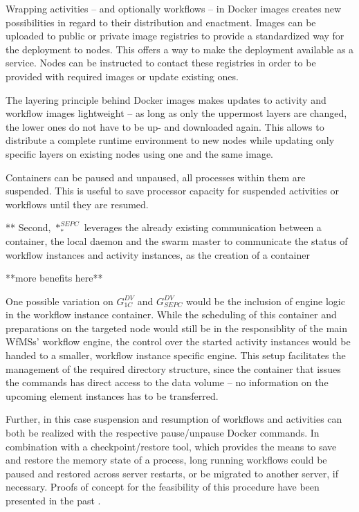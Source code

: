     Wrapping activities -- and optionally workflows -- in Docker images creates new possibilities in regard to their distribution and enactment. Images can be uploaded to public or private image registries to provide a standardized way for the deployment to nodes. This offers a way to make the deployment available as a service. Nodes can be instructed to contact these registries in order to be provided with required images or update existing ones.

    The layering principle behind Docker images makes updates to activity and workflow images lightweight -- as long as only the uppermost layers are changed, the lower ones do not have to be up- and downloaded again. This allows to distribute a complete runtime environment to new nodes while updating only specific layers on existing nodes using one and the same image.

    Containers can be paused and unpaused, \ie all processes within them are suspended. This is useful to save processor capacity for suspended activities or workflows until they are resumed.

    ** Second, $*_{*}^{SEPC}$ leverages the already existing communication between a container, the local daemon and the swarm master to communicate the status of workflow instances and activity instances, as the creation of a container

    **more benefits here**


    One possible variation on $G_{1C}^{DV}$ and $G_{SEPC}^{DV}$ would be the inclusion of engine logic in the workflow instance container. While the scheduling of this container and preparations on the targeted node would still be in the responsiblity of the main \acp{WfMS}' workflow engine, the control over the started activity instances would be handed to a smaller, workflow instance specific engine.
    This setup facilitates the management of the required directory structure, since the container that issues the commands has direct access to the data volume -- no information on the upcoming element instances has to be transferred.

    Further, in this case suspension and resumption of workflows and activities can both be realized with the respective pause/unpause Docker commands. In combination with a checkpoint/restore tool, which provides the means to save and restore the memory state of a process, long running workflows could be paused and restored across server restarts, or be migrated to another server, if necessary. Proofs of concept for the feasibility of this procedure have been presented in the past \cite{Kim2015Checkpoint,Merker2015How}.

